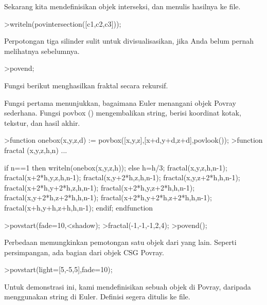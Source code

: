 \documentclass[a4paper,10pt]{article}
\begin{document}
\begin{eulernotebook}
\begin{eulercomment}
\begin{eulercomment}
\begin{euleroutput}
\end{euleroutput}
\begin{eulercomment}
Sekarang kita mendefinisikan objek interseksi, dan menulis hasilnya ke
file.
\end{eulercomment}
\begin{eulerprompt}
>writeln(povintersection([c1,c2,c3]));
\end{eulerprompt}
\begin{eulercomment}
Perpotongan tiga silinder sulit untuk divisualisasikan, jika Anda
belum pernah melihatnya sebelumnya.
\end{eulercomment}
\begin{eulerprompt}
>povend;
\end{eulerprompt}
\begin{eulercomment}
Fungsi berikut menghasilkan fraktal secara rekursif.

Fungsi pertama menunjukkan, bagaimana Euler menangani objek Povray
sederhana. Fungsi povbox () mengembalikan string, berisi koordinat
kotak, tekstur, dan hasil akhir.
\end{eulercomment}
\begin{eulerprompt}
>function onebox(x,y,z,d) := povbox([x,y,z],[x+d,y+d,z+d],povlook());
>function fractal (x,y,z,h,n) ...
\end{eulerprompt}
\begin{eulerudf}
   if n==1 then writeln(onebox(x,y,z,h));
   else
     h=h/3;
     fractal(x,y,z,h,n-1);
     fractal(x+2*h,y,z,h,n-1);
     fractal(x,y+2*h,z,h,n-1);
     fractal(x,y,z+2*h,h,n-1);
     fractal(x+2*h,y+2*h,z,h,n-1);
     fractal(x+2*h,y,z+2*h,h,n-1);
     fractal(x,y+2*h,z+2*h,h,n-1);
     fractal(x+2*h,y+2*h,z+2*h,h,n-1);
     fractal(x+h,y+h,z+h,h,n-1);
   endif;
  endfunction
\end{eulerudf}
\begin{eulerprompt}
>povstart(fade=10,<shadow);
>fractal(-1,-1,-1,2,4);
>povend();
\end{eulerprompt}
\begin{eulercomment}
Perbedaan memungkinkan pemotongan satu objek dari yang lain. Seperti
persimpangan, ada bagian dari objek CSG Povray.
\end{eulercomment}
\begin{eulerprompt}
>povstart(light=[5,-5,5],fade=10);
\end{eulerprompt}
\begin{eulercomment}
Untuk demonstrasi ini, kami mendefinisikan sebuah objek di Povray,
daripada menggunakan string di Euler. Definisi segera ditulis ke file.


\end{eulercomment}
\end{eulercomment}
\end{eulercomment}
\end{eulernotebook}
\end{document}
